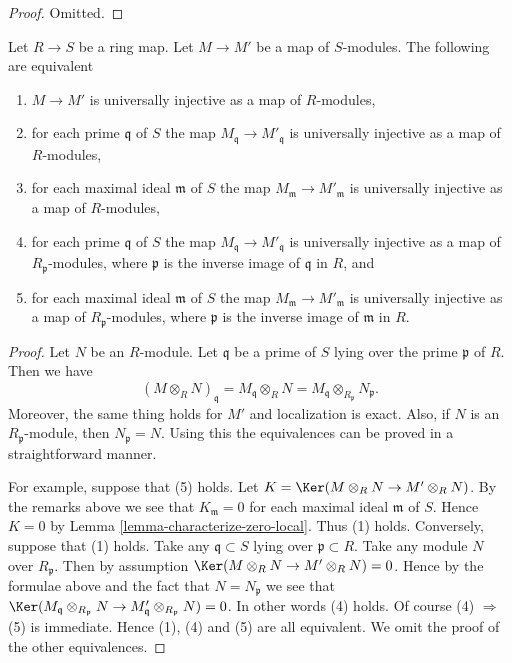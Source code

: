 \begin{proof}
Omitted.
\end{proof}

\begin{lemma}
\label{lemma-universally-injective-check-stalks}
Let $R \to S$ be a ring map.
Let $M \to M'$ be a map of $S$-modules.
The following are equivalent
\begin{enumerate}
\item $M \to M'$ is universally injective as a map of $R$-modules,
\item for each prime $\mathfrak q$ of $S$ the map
$M_{\mathfrak q} \to M'_{\mathfrak q}$ is universally injective
as a map of $R$-modules,
\item for each maximal ideal $\mathfrak m$ of $S$ the map
$M_{\mathfrak m} \to M'_{\mathfrak m}$ is universally injective
as a map of $R$-modules,
\item for each prime $\mathfrak q$ of $S$ the map
$M_{\mathfrak q} \to M'_{\mathfrak q}$ is universally injective
as a map of $R_{\mathfrak p}$-modules, where $\mathfrak p$ is the
inverse image of $\mathfrak q$ in $R$, and
\item for each maximal ideal $\mathfrak m$ of $S$ the map
$M_{\mathfrak m} \to M'_{\mathfrak m}$ is universally injective
as a map of $R_{\mathfrak p}$-modules, where $\mathfrak p$ is the
inverse image of $\mathfrak m$ in $R$.
\end{enumerate}
\end{lemma}

\begin{proof}
Let $N$ be an $R$-module. Let $\mathfrak q$ be a prime of $S$ lying over
the prime $\mathfrak p$ of $R$. Then we have
$$
(M \otimes_R N)_{\mathfrak q} =
M_{\mathfrak q} \otimes_R N =
M_{\mathfrak q} \otimes_{R_{\mathfrak p}} N_{\mathfrak p}.
$$
Moreover, the same thing holds for $M'$ and localization is exact.
Also, if $N$ is an $R_{\mathfrak p}$-module, then $N_{\mathfrak p} = N$.
Using this the equivalences can be proved in a straightforward manner.

\medskip\noindent
For example, suppose that (5) holds. Let
$K = \Ker(M \otimes_R N \to M' \otimes_R N)$. By the remarks
above we see that $K_{\mathfrak m} = 0$ for each maximal ideal $\mathfrak m$
of $S$. Hence $K = 0$ by
Lemma \ref{lemma-characterize-zero-local}.
Thus (1) holds. Conversely, suppose that (1) holds. Take any
$\mathfrak q \subset S$ lying over $\mathfrak p \subset R$.
Take any module $N$ over $R_{\mathfrak p}$. Then
by assumption $\Ker(M \otimes_R N \to M' \otimes_R N) = 0$.
Hence by the formulae above and the fact that $N = N_{\mathfrak p}$
we see that
$\Ker(M_{\mathfrak q} \otimes_{R_{\mathfrak p}} N \to
M'_{\mathfrak q} \otimes_{R_{\mathfrak p}} N) = 0$. In other words
(4) holds. Of course (4) $\Rightarrow$ (5) is immediate. Hence
(1), (4) and (5) are all equivalent.
We omit the proof of the other equivalences.
\end{proof}

